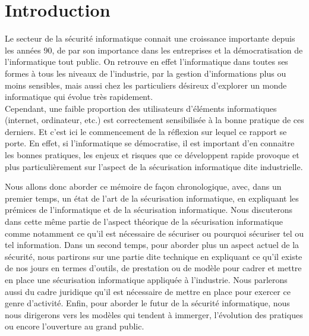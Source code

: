\documentclass[a4paper]{memoir}
\begin{document}
\cleardoublepage
\tableofcontents*


\mainmatter%


\chapter*{Introduction}

Le secteur de la sécurité informatique connait une croissance importante depuis les années 90, de par son importance dans les entreprises et la démocratisation de l'informatique tout public. On retrouve en effet l'informatique dans toutes ses formes à tous les niveaux de l'industrie, par la gestion d'informations plus ou moins sensibles, mais aussi chez les particuliers désireux d'explorer un monde informatique qui évolue très rapidement.\\

Cependant, une faible proportion des utilisateurs d'éléments informatiques (internet, ordinateur, etc.) est correctement sensibilisée à la bonne pratique de ces derniers. Et c'est ici le commencement de la réflexion sur lequel ce rapport se porte. En effet, si l'informatique se démocratise, il est important d'en connaitre les bonnes pratiques, les enjeux et risques que ce développent rapide provoque et plus particulièrement sur l'aspect de la sécurisation informatique dite industrielle.

Nous allons donc aborder ce mémoire de façon chronologique, avec, dans un premier temps, un état de l'art de la sécurisation informatique, en expliquant les prémices de l'informatique et de la sécurisation informatique. Nous discuterons dans cette même partie de l'aspect théorique de la sécurisation informatique comme notamment ce qu'il est nécessaire de sécuriser ou pourquoi sécuriser tel ou tel information.
Dans un second temps, pour aborder plus un aspect actuel de la sécurité, nous partirons sur une partie dite technique en expliquant ce qu'il existe de nos jours en termes d'outils, de prestation ou de modèle pour cadrer et mettre en place une sécurisation informatique appliquée à l'industrie. Nous parlerons aussi du cadre juridique qu'il est nécessaire de mettre en place pour exercer ce genre d'activité. Enfin, pour aborder le futur de la sécurité informatique, nous nous dirigerons vers les modèles qui tendent à immerger, l'évolution des pratiques ou encore l'ouverture au grand public.\\
\end{document}
